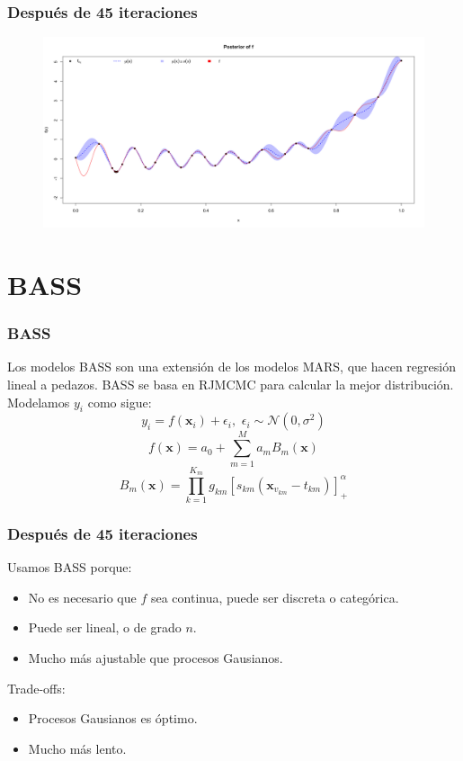 \documentclass[fleqn]{beamer}
\begin{document}
\begin{frame}
  \frametitle{Después de 45 iteraciones}
  \begin{figure}[h]
    \centering
    \includegraphics[width=1\textwidth]{Figures/45iter.png}
    \label{fig:45iter}
  \end{figure}
\end{frame}

\section{BASS}
\begin{frame}
  \frametitle{BASS}
  Los modelos BASS son una extensión de los modelos MARS, que hacen regresión lineal a pedazos. BASS se basa en RJMCMC para calcular la mejor distribución. 
  \newline \\
  Modelamos $y_i$ como sigue:
    $$ y_i = f(\boldsymbol{x}_i) + \epsilon_i, \, \, \epsilon_i \sim \mathcal{N}(0,\sigma^2) $$
    $$ f(\boldsymbol{x}) = a_0 + \sum_{m=1}^{M} a_m B_m(\boldsymbol{x}) $$
    $$ B_m(\boldsymbol{x}) = \prod_{k=1}^{K_m} g_{km} [s_{km}(\boldsymbol{x}_{v_{km}} - t_{km}) ]^\alpha_+ $$
\end{frame}

\begin{frame}
  \frametitle{Después de 45 iteraciones}
  Usamos BASS porque: 
  \begin{itemize}
      \item No es necesario que $f$ sea continua, puede ser discreta o categórica. 
      \item Puede ser lineal, o de grado $n$. 
      \item Mucho más ajustable que procesos Gausianos. 
  \end{itemize}
  Trade-offs: 
  \begin{itemize}
      \item Procesos Gausianos es óptimo. 
      \item Mucho más lento. 
  \end{itemize}
\end{frame}
\end{document}
